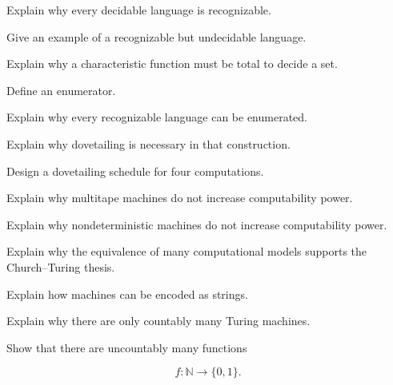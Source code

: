 \begin{exercise}[2]
Explain why every decidable language is recognizable.
\end{exercise}

\begin{exercise}[3]
Give an example of a recognizable but undecidable language.
\end{exercise}

\begin{exercise}[3]
Explain why a characteristic function must be total to decide a set.
\end{exercise}

\begin{exercise}[2]
Define an enumerator.
\end{exercise}

\begin{exercise}[3]
Explain why every recognizable language can be enumerated.
\end{exercise}

\begin{exercise}[3]
Explain why dovetailing is necessary in that construction.
\end{exercise}

\begin{exercise}[3]
Design a dovetailing schedule for four computations.
\end{exercise}

\begin{exercise}[2]
Explain why multitape machines do not increase computability power.
\end{exercise}

\begin{exercise}[2]
Explain why nondeterministic machines do not increase computability power.
\end{exercise}

\begin{exercise}[3]
Explain why the equivalence of many computational models supports the
Church--Turing thesis.
\end{exercise}

\begin{exercise}[2]
Explain how machines can be encoded as strings.
\end{exercise}

\begin{exercise}[2]
Explain why there are only countably many Turing machines.
\end{exercise}

\begin{exercise}[3]
Show that there are uncountably many functions

\[
f:\mathbb{N}\to\{0,1\}.
\]
\end{exercise}

